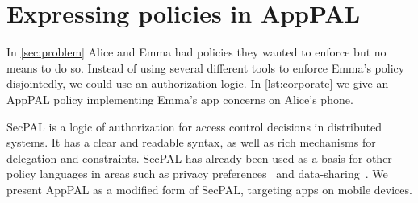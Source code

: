 \documentclass[]{llncs}
\begin{document}
\section{Expressing policies in AppPAL}
\label{sec:idea}

In \autoref{sec:problem} Alice and Emma had policies they wanted to enforce but no means to do so.
Instead of using several different tools to enforce Emma's policy disjointedly, we could use an authorization logic.
In \autoref{lst:corporate} we give an AppPAL policy implementing Emma's app concerns on Alice's phone.

SecPAL is a logic of authorization for access control decisions in distributed systems.
It has a clear and readable syntax, as well as rich mechanisms for delegation and constraints.
SecPAL has already been used as a basis for other policy languages in areas such as privacy preferences~\cite{Becker:2009ula} and data-sharing~\cite{Aziz:2011vt}.
We present AppPAL as a modified form of SecPAL, targeting apps on mobile devices.
\end{document}
